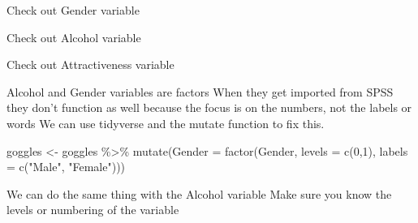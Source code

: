 \documentclass[
]{book}
\newenvironment{Shaded}{\begin{snugshade}}{\end{snugshade}}
\newcommand{\AttributeTok}[1]{\textcolor[rgb]{0.77,0.63,0.00}{#1}}
\newcommand{\DecValTok}[1]{\textcolor[rgb]{0.00,0.00,0.81}{#1}}
\newcommand{\FunctionTok}[1]{\textcolor[rgb]{0.00,0.00,0.00}{#1}}
\newcommand{\NormalTok}[1]{#1}
\newcommand{\OtherTok}[1]{\textcolor[rgb]{0.56,0.35,0.01}{#1}}
\newcommand{\SpecialCharTok}[1]{\textcolor[rgb]{0.00,0.00,0.00}{#1}}
\newcommand{\StringTok}[1]{\textcolor[rgb]{0.31,0.60,0.02}{#1}}
\begin{document}
Check out Gender variable

\begin{Shaded}
\end{Shaded}

Check out Alcohol variable

\begin{Shaded}
\end{Shaded}

Check out Attractiveness variable

\begin{Shaded}
\end{Shaded}

Alcohol and Gender variables are factors
When they get imported from SPSS they don't function as well because the focus is on the numbers, not the labels or words
We can use tidyverse and the mutate function to fix this.

\begin{Shaded}
\begin{Highlighting}[]
\NormalTok{goggles }\OtherTok{\textless{}{-}}\NormalTok{ goggles }\SpecialCharTok{\%\textgreater{}\%} 
  \FunctionTok{mutate}\NormalTok{(}\AttributeTok{Gender =} \FunctionTok{factor}\NormalTok{(Gender, }\AttributeTok{levels =} \FunctionTok{c}\NormalTok{(}\DecValTok{0}\NormalTok{,}\DecValTok{1}\NormalTok{), }
         \AttributeTok{labels =} \FunctionTok{c}\NormalTok{(}\StringTok{"Male"}\NormalTok{, }\StringTok{"Female"}\NormalTok{)))}
\end{Highlighting}
\end{Shaded}

We can do the same thing with the Alcohol variable
Make sure you know the levels or numbering of the variable

\begin{Shaded}
\end{Shaded}
\end{document}
